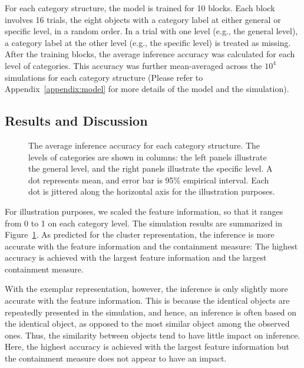 \documentclass[doc]{apa6}
\begin{document}
For each category structure, the model is trained for 10 blocks. Each block involves 16 trials, the
eight objects with a category label at either general or specific level, in a random order.  In a trial
with one level (e.g., the general level), a category label at the other level (e.g., the specific level)
is treated as missing.  After the training blocks, the average inference accuracy was calculated for
each level of categories.  This accuracy was further mean-averaged across the $10^{4}$ simulations
for each category structure (Please refer to Appendix~\ref{appendix:model} for more details of the
    model and the simulation).


\subsection*{Results and Discussion}

\begin{figure}[t!]
    \centering



    \caption{The average inference accuracy for each category structure. The levels of categories
    are shown in columns: the left panels illustrate the general level, and the right panels
    illustrate the specific level.  A dot represents mean, and error bar is 95\% empirical interval.
    Each dot is jittered along the horizontal axis for the illustration purposes.}

\label{fig:result}
\end{figure}

For illustration purposes, we scaled the feature information, so that it ranges from 0 to 1 on each
category level. The simulation results are summarized in Figure~\ref{fig:result}. As predicted for
the cluster representation, the inference is more accurate with the feature information and the
containment measure: The highest accuracy is achieved with the largest feature information and the
largest containment measure.

With the exemplar representation, however, the inference is only slightly more accurate with the
feature information. This is because the identical objects are repeatedly presented in the
simulation, and hence, an inference is often based on the identical object, as opposed to the most
similar object among the observed ones. Thus, the similarity between objects tend to have little
impact on inference.  Here, the highest accuracy is achieved with the largest feature information
but the containment measure does not appear to have an impact.
\end{document}
